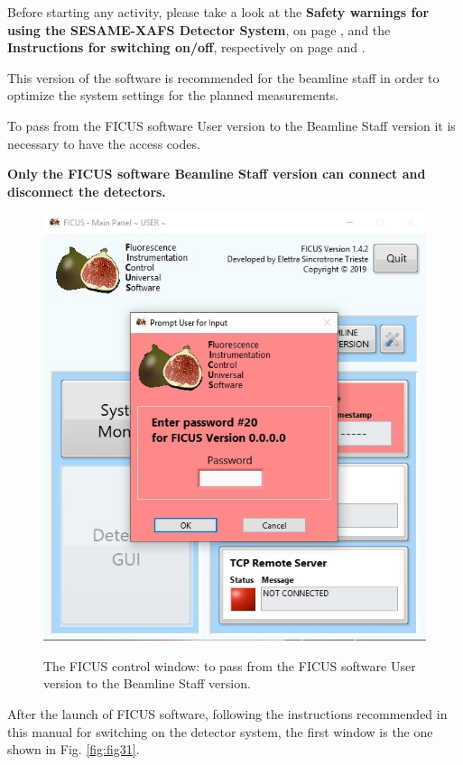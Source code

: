 \documentclass[a4paper,12pt,oneside,pdflatex,italian,final,twocolumn]{article}
\begin{document}
Before starting any activity, please take a look at the \textbf{Safety warnings for using the SESAME-XAFS Detector System}, on page \pageref{accensione}, and the \textbf{Instructions for switching on/off}, respectively on page \pageref{accensione} and \pageref{spegnimento}.

This version of the software is recommended for the beamline staff in order to optimize the system settings for the planned measurements.

To pass from the FICUS software User version to the Beamline Staff version it is necessary to have the access codes.

\textbf{Only the FICUS software Beamline Staff version can connect and disconnect the detectors. }

\begin{figure}[h]
\centering
{\includegraphics[width=.5\textwidth]{Cattura74.jpg}} \quad
\caption{The FICUS control window: to pass from the FICUS software User version to the Beamline Staff version.}\label{fig:fig30}
\end{figure}

After the launch of FICUS software, following the instructions recommended in this manual for switching on the detector system, the first window is the one shown in Fig. \ref{fig:fig31}.
\end{document}
